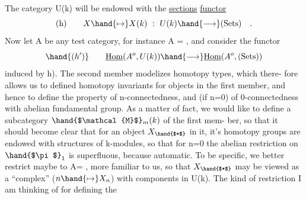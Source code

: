 The category U(k) will be endowed with the \uline{sections} \uline{functor}
\[ \text{(h)} \qquad X \hand{\mapsto} X(k) \ : \ U(k) \hand{\longrightarrow} \text{(Sets)} \quad . \]
Now let A be any test category,  for instance A = \hand{$\Delta$},  and consider
the functor
\[ \hand{(h')} \qquad \underline{\mathrm{Hom}}(A^{o},U(k)) \hand{\longrightarrow} \underline{\mathrm{Hom}}(A^{o},\text{(Sets)}) \]
induced by h).  The second member modelizes homotopy types,  which there-%
fore allows us to defined homotopy invariants for objects in the first
member,  and hence to define the property of n-connectedness,  and (if
n=0)  of 0-connectedness with abelian fundamental group.  As a matter of
fact,  we would like to define a subcategory $\hand{$\mathcal{M}$}_m(k)$   of the first mem-%
ber,  so that it should become clear that for an object $X_{\hand{$*$}}$  in it, it's
homotopy groups are endowed with structures of k-modules,  so that for
n=0  the abelian restriction on $\hand{$\pi$}_1$ is superfluous,  because automatic.
To be specific,  we better restrict maybe to A= \hand{$\Delta$},  more familiar to
us,  so that $X_{\hand{$*$}}$ may be viewed as a ``complex''  ($n \hand{\mapsto} X_n$)  with components
in U(k).  The kind of restriction I am thinking of for defining the


